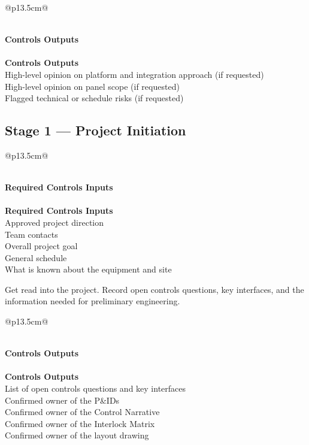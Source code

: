 \begin{longtable}{@{}p{13.5cm}@{}}
\caption{Stage 0 --- Controls Outputs}\label{tab:stage0-outputs} \\
\toprule
{}\textbf{Controls Outputs} \\
\midrule
\endfirsthead
{} \\
\toprule
{}\textbf{Controls Outputs} \\
\midrule
\endhead
High-level opinion on platform and integration approach (if requested) \\
High-level opinion on panel scope (if requested) \\
Flagged technical or schedule risks (if requested) \\
\bottomrule
\end{longtable}

\subsection{Stage 1 --- Project Initiation}

\begin{longtable}{@{}p{13.5cm}@{}}
\caption{Stage 1 --- Required Controls Inputs}\label{tab:stage1-inputs} \\
\toprule
{}\textbf{Required Controls Inputs} \\
\midrule
\endfirsthead
{} \\
\toprule
{}\textbf{Required Controls Inputs} \\
\midrule
\endhead
Approved project direction \\
Team contacts \\
Overall project goal \\
General schedule \\
What is known about the equipment and site \\
\bottomrule
\end{longtable}

Get read into the project. Record open controls questions, key interfaces, and the information needed for preliminary engineering.

\begin{longtable}{@{}p{13.5cm}@{}}
\caption{Stage 1 --- Controls Outputs}\label{tab:stage1-outputs} \\
\toprule
{}\textbf{Controls Outputs} \\
\midrule
\endfirsthead
{} \\
\toprule
{}\textbf{Controls Outputs} \\
\midrule
\endhead
List of open controls questions and key interfaces \\
Confirmed owner of the P\&IDs \\
Confirmed owner of the Control Narrative \\
Confirmed owner of the Interlock Matrix \\
Confirmed owner of the layout drawing \\
\bottomrule
\end{longtable}

